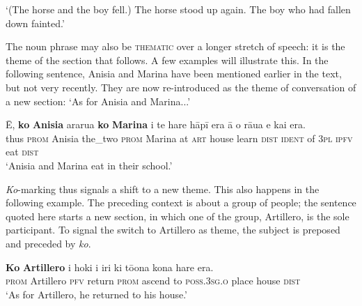 \glt 
‘(The horse and the boy fell.) The horse stood up again. The boy who had fallen down fainted.’ \textstyleExampleref{[R399.025–026]}
\z

The noun phrase may also be \textsc{thematic} over a longer stretch of speech: it is the theme of the section that follows. A few examples will illustrate this. In the following sentence, Anisia and Marina have been mentioned earlier in the text, but not very recently. They are now re-introduced as the theme of conversation of a new section: ‘As for Anisia and Marina...’

\ea\label{ex:8.83}
\gll {\ꞌ}Ē, \textbf{ko} \textbf{Anisia} ararua \textbf{ko} \textbf{Marina} {\ꞌ}i te hare hāpī era {\ꞌ}ā o rāua  e kai era.\\
thus \textsc{prom} Anisia the\_two \textsc{prom} Marina at \textsc{art} house learn \textsc{dist} \textsc{ident} of \textsc{3pl}  \textsc{ipfv} eat \textsc{dist}\\

\glt
‘Anisia and Marina eat in their school.’ \textstyleExampleref{[R103.191]} 
\z

\textit{Ko}-marking thus signals a shift to a new theme. This also happens in the following example. The preceding context is about a group of people; the sentence quoted here starts a new section, in which one of the group, Artillero, is the sole participant. To signal the switch to Artillero as theme, the subject is preposed and preceded by \textit{ko}.

\ea\label{ex:8.84}
\gll \textbf{Ko} \textbf{Artillero} i hoki i iri ki tō{\ꞌ}ona kona hare era. \\
\textsc{prom} Artillero \textsc{pfv} return \textsc{prom} ascend to \textsc{poss.3sg.o} place house \textsc{dist} \\

\glt
‘As for Artillero, he returned to his house.’ \textstyleExampleref{[R437.055]} 
\z

